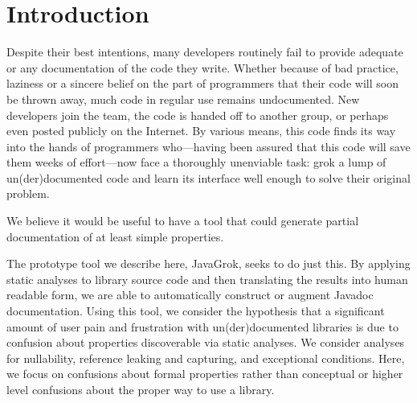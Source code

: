 \section{Introduction}

Despite their best intentions, many developers routinely fail to provide
adequate or any documentation of the code they write.  Whether because of bad
practice, laziness or a sincere belief on the part of programmers that their
code will soon be thrown away, much code in regular use remains undocumented.
New developers join the team, the code is handed off to another group, or
perhaps even posted publicly on the Internet.  By various means, this code
finds its way into the hands of programmers who---having been assured that this
code will save them weeks of effort---now face a thoroughly unenviable task:
grok a lump of un(der)documented code and learn its interface well enough
to solve their original problem.


We believe it would be useful to have a tool that could generate partial
documentation of at least simple properties.

The prototype tool we describe here, JavaGrok, seeks to do just this.  By
applying static analyses to library source code and then
translating the results into human readable form, we are able to
automatically construct or augment Javadoc documentation.
Using this tool, we
consider the hypothesis that a significant amount of user pain and frustration
with un(der)documented libraries is due to confusion about
properties discoverable via static analyses. We consider analyses for nullability,
reference leaking and capturing, and exceptional conditions.
Here, we focus on confusions about formal properties
rather than conceptual
or higher level confusions about the proper way to use a library.

